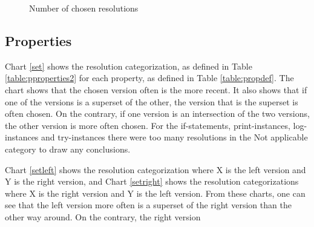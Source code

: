 \begin{figure}
\caption{Number of chosen resolutions}\label{fig:groups}
\end{figure}
\FloatBarrier


\subsection{Properties}
Chart \ref{set} shows the resolution categorization, as defined in Table \ref{table:pproperties2} for each property, as defined in Table \ref{table:propdef}. The chart shows that the chosen version often is the more recent. It also shows that if one of the versions is a superset of the other, the version that is the superset is often chosen. On the contrary, if one version is an intersection of the two versions, the other version is more often chosen. For the if-statements, print-instances, log-instances and try-instances there were too many resolutions in the Not applicable category to draw any conclusions. 

Chart \ref{setleft} shows the resolution categorization where X is the left version and Y is the right version, and Chart \ref{setright} shows the resolution categorizations where X is the right version and Y is the left version. From these charts, one can see that the left version more often is a superset of the right version than the other way around. On the contrary, the right version 

